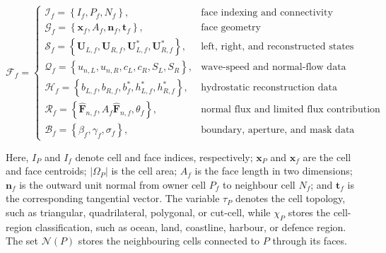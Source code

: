 \documentclass[11pt]{article}
\begin{document}
\begin{equation}
  \label{eq:face_data_container}
  \mathcal{F}_f
  =
  \begin{cases}
      \mathcal{I}_f
      =
      \left\{
          I_f,
          P_f,
          N_f
      \right\},
      & \text{face indexing and connectivity}
      \\[0.75em]
      \mathcal{G}_f
      =
      \left\{
          \mathbf{x}_f,
          A_f,
          \mathbf{n}_f,
          \mathbf{t}_f
      \right\},
      & \text{face geometry}
      \\[0.75em]
      \mathcal{S}_f
      =
      \left\{
          \mathbf{U}_{L,f},
          \mathbf{U}_{R,f},
          \mathbf{U}_{L,f}^{*},
          \mathbf{U}_{R,f}^{*}
      \right\},
      & \text{left, right, and reconstructed states}
      \\[0.75em]
      \mathcal{Q}_f
      =
      \left\{
          u_{n,L},
          u_{n,R},
          c_L,
          c_R,
          S_L,
          S_R
      \right\},
      & \text{wave-speed and normal-flow data}
      \\[0.75em]
      \mathcal{H}_f
      =
      \left\{
          b_{L,f},
          b_{R,f},
          b_f^{*},
          h_{L,f}^{*},
          h_{R,f}^{*}
      \right\},
      & \text{hydrostatic reconstruction data}
      \\[0.75em]
      \mathcal{R}_f
      =
      \left\{
          \widehat{\mathbf{F}}_{n,f},
          A_f\widehat{\mathbf{F}}_{n,f},
          \theta_f
      \right\},
      & \text{normal flux and limited flux contribution}
      \\[0.75em]
      \mathcal{B}_f
      =
      \left\{
          \beta_f,
          \gamma_f,
          \sigma_f
      \right\},
      & \text{boundary, aperture, and mask data}
  \end{cases}
\end{equation}

Here, $I_P$ and $I_f$ denote cell and face indices, respectively; $\mathbf{x}_P$ and $\mathbf{x}_f$ are the cell and face centroids; $|\Omega_P|$ is the cell area; $A_f$ is the face length in two dimensions; $\mathbf{n}_f$ is the outward unit normal from owner cell $P_f$ to neighbour cell $N_f$; and $\mathbf{t}_f$ is the corresponding tangential vector. The variable $\tau_P$ denotes the cell topology, such as triangular, quadrilateral, polygonal, or cut-cell, while $\chi_P$ stores the cell-region classification, such as ocean, land, coastline, harbour, or defence region. The set $\mathcal{N}(P)$ stores the neighbouring cells connected to $P$ through its faces.
\end{document}

